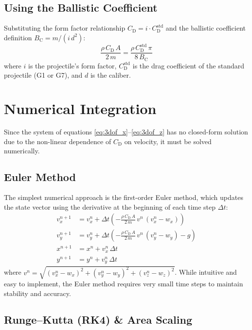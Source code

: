 \documentclass[11pt,twoside,openright]{report}
\newcommand{\Cd}{C_{\mathrm{D}}}
\newcommand{\Bc}{B_{\mathrm{C}}}
\begin{document}
\subsection{Using the Ballistic Coefficient}

Substituting the form factor relationship $\Cd = i \cdot \Cd^{\mathrm{std}}$ and the ballistic coefficient definition $\Bc = m/(i\,d^2)$:
\begin{equation}
  \frac{\rho\,\Cd\,A}{2\,m} = \frac{\rho\,\Cd^{\mathrm{std}}\,\pi}{8\,\Bc}
  \label{eq:drag_with_bc}
\end{equation}
where $i$ is the projectile's form factor, $\Cd^{\mathrm{std}}$ is the drag coefficient of the standard projectile (G1 or G7), and $d$ is the caliber.

\section{Numerical Integration}
\label{sec:numerical}

Since the system of equations \eqref{eq:3dof_x}--\eqref{eq:3dof_z} has no closed-form solution due to the non-linear dependence of $\Cd$ on velocity, it must be solved numerically.

\subsection{Euler Method}

The simplest numerical approach is the first-order Euler method, which updates the state vector using the derivative at the beginning of each time step $\Delta t$:
\begin{align}
  v_x^{n+1} &= v_x^n + \Delta t \left(-\frac{\rho\,\Cd\,A}{2\,m}\,v^n\,(v_x^n - w_x)\right) \label{eq:euler_vx}\\
  v_y^{n+1} &= v_y^n + \Delta t \left(-\frac{\rho\,\Cd\,A}{2\,m}\,v^n\,(v_y^n - w_y) - g\right) \label{eq:euler_vy}\\
  x^{n+1} &= x^n + v_x^n\,\Delta t \label{eq:euler_x}\\
  y^{n+1} &= y^n + v_y^n\,\Delta t \label{eq:euler_y}
\end{align}
where $v^n = \sqrt{(v_x^n-w_x)^2 + (v_y^n-w_y)^2 + (v_z^n-w_z)^2}$. While intuitive and easy to implement, the Euler method requires very small time steps to maintain stability and accuracy.

\subsection{Runge--Kutta (RK4) \& Area Scaling}
\end{document}
